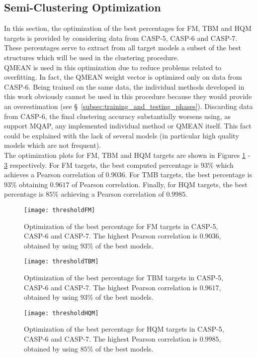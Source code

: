 \subsection{Semi-Clustering Optimization}
\label{subsec:semiclustering_optimization}
In this section, the optimization of the best percentages for FM, TBM and HQM targets is provided by considering data from CASP-5, CASP-6 and CASP-7. These percentages serve to extract from all target models a subset of the best structures which will be used in the clustering procedure. \\
QMEAN is used in this optimization due to reduce problems related to overfitting. In fact, the QMEAN weight vector is optimized only on data from CASP-6. Being trained on the same data, the individual methods developed in this work obviously cannot be used in this procedure because they would provide an overestimation (see \S~\ref{subsec:training_and_testing_phases}). Discarding data from CASP-6, the final clustering accuracy substantially worsens using, as support MQAP, any implemented individual method or QMEAN itself. This fact could be explained with the lack of several models (in particular high quality models which are not frequent).\\
The optimization plots for FM, TBM and HQM targets are shown in Figures \ref{fig:thresholdFM} - \ref{fig:thresholdHQM} respectively. For FM targets, the best computed percentage is $93\%$ which achieves a Pearson correlation of $0.9036$. For TMB targets, the best percentage is $93\%$ obtaining $0.9617$ of Pearson correlation. Finally, for HQM targets, the best percentage is $85\%$ achieving a Pearson correlation of $0.9985$.
\begin{figure}[htbp]
	\begin{center}
		\texttt{[image: thresholdFM]}
		\caption[Optimization of the best percentage for FM targets]{Optimization of the best percentage for FM targets in CASP-5, CASP-6 and CASP-7. The highest Pearson correlation is $0.9036$, obtained by using $93\%$ of the best models.}
		\label{fig:thresholdFM}
	\end{center}
\end{figure}
\begin{figure}[htbp]
	\begin{center}
		\texttt{[image: thresholdTBM]}
		\caption[Optimization of the best percentage for TBM targets]{Optimization of the best percentage for TBM targets in CASP-5, CASP-6 and CASP-7. The highest Pearson correlation is $0.9617$, obtained by using $93\%$ of the best models.}
		\label{fig:thresholdTBM}
	\end{center}
\end{figure}
\begin{figure}[htbp]
	\begin{center}
		\texttt{[image: thresholdHQM]}
		\caption[Optimization of the best percentage for HQM targets]{Optimization of the best percentage for HQM targets in CASP-5, CASP-6 and CASP-7. The highest Pearson correlation is $0.9985$, obtained by using $85\%$ of the best models.}
		\label{fig:thresholdHQM}
	\end{center}
\end{figure}


